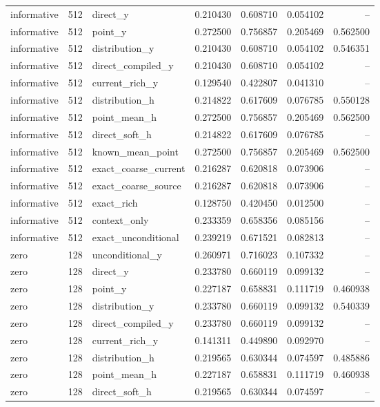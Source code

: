 \begin{longtable}{lllrrrr}
informative & 512 & direct\_y & 0.210430 & 0.608710 & 0.054102 & -- \\
informative & 512 & point\_y & 0.272500 & 0.756857 & 0.205469 & 0.562500 \\
informative & 512 & distribution\_y & 0.210430 & 0.608710 & 0.054102 & 0.546351 \\
informative & 512 & direct\_compiled\_y & 0.210430 & 0.608710 & 0.054102 & -- \\
informative & 512 & current\_rich\_y & 0.129540 & 0.422807 & 0.041310 & -- \\
informative & 512 & distribution\_h & 0.214822 & 0.617609 & 0.076785 & 0.550128 \\
informative & 512 & point\_mean\_h & 0.272500 & 0.756857 & 0.205469 & 0.562500 \\
informative & 512 & direct\_soft\_h & 0.214822 & 0.617609 & 0.076785 & -- \\
informative & 512 & known\_mean\_point & 0.272500 & 0.756857 & 0.205469 & 0.562500 \\
informative & 512 & exact\_coarse\_current & 0.216287 & 0.620818 & 0.073906 & -- \\
informative & 512 & exact\_coarse\_source & 0.216287 & 0.620818 & 0.073906 & -- \\
informative & 512 & exact\_rich & 0.128750 & 0.420450 & 0.012500 & -- \\
informative & 512 & context\_only & 0.233359 & 0.658356 & 0.085156 & -- \\
informative & 512 & exact\_unconditional & 0.239219 & 0.671521 & 0.082813 & -- \\
zero & 128 & unconditional\_y & 0.260971 & 0.716023 & 0.107332 & -- \\
zero & 128 & direct\_y & 0.233780 & 0.660119 & 0.099132 & -- \\
zero & 128 & point\_y & 0.227187 & 0.658831 & 0.111719 & 0.460938 \\
zero & 128 & distribution\_y & 0.233780 & 0.660119 & 0.099132 & 0.540339 \\
zero & 128 & direct\_compiled\_y & 0.233780 & 0.660119 & 0.099132 & -- \\
zero & 128 & current\_rich\_y & 0.141311 & 0.449890 & 0.092970 & -- \\
zero & 128 & distribution\_h & 0.219565 & 0.630344 & 0.074597 & 0.485886 \\
zero & 128 & point\_mean\_h & 0.227187 & 0.658831 & 0.111719 & 0.460938 \\
zero & 128 & direct\_soft\_h & 0.219565 & 0.630344 & 0.074597 & -- \\

\end{longtable}
